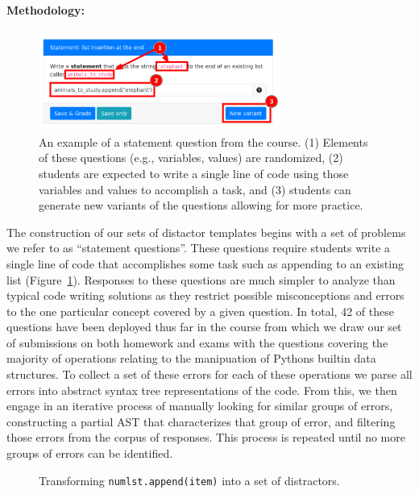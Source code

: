 \documentclass[authorversion,nonacm]{acmart}
\begin{document}
\paragraph{Methodology:}

\begin{figure}
  \centering
  \includegraphics[width=300px]{imgs/pl-question.png}
  \caption{
    An example of a statement question from the course. (1) Elements of these
    questions (e.g., variables, values) are randomized, (2) students are
    expected to write a single line of code using those variables and values to
    accomplish a task, and (3) students can generate new variants of the
    questions allowing for more practice.
  } 
  \label{fig:append-stmnt}
\end{figure}

The construction of our sets of distactor templates begins with a set of
problems we refer to as ``statement questions''. These questions require students
write a single line of code that accomplishes some task such as appending to an
existing list (Figure~\ref{fig:append-stmnt}). Responses to these questions are
much simpler to analyze than typical code writing solutions as they restrict
possible misconceptions and errors to the one particular concept covered by a
given question.  In total, 42 of these questions have been deployed thus far in
the course from which we draw our set of submissions on both homework and exams
with the questions covering the majority of operations relating to the manipuation of 
Pythons builtin data structures. To collect a set of these 
errors for each of these operations we parse all errors into abstract syntax
tree representations of the code. From this, we then engage in an iterative 
process of manually looking for similar groups of errors, constructing a 
partial AST that characterizes that group of error, and filtering those errors
from the corpus of responses. This process is repeated until no more groups of
errors can be identified.  

\begin{figure}[t]
    \centering
    \resizebox{0.5\textwidth}{!}{
        
    }
    \caption{Transforming \texttt{numlst.append(item)} into a set of distractors.}
    \label{fig:appendastmatchesed}
\end{figure}
\end{document}
